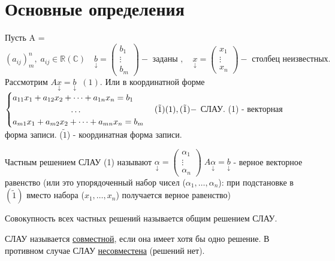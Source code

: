 \documentclass[../main.tex]{subfiles}
\begin{document}
\section{Основные определения}
\noindent Пусть A = $(a_{ij})_{m}^{n},\; a_{ij}\in\mathbb{R}(\mathbb{C})\quad \underset{\downarrow}{b}=\begin{pmatrix} {b}_{1}\\ \vdots\\ {b}_{m} \end{pmatrix}- \text{ заданы },\quad \underset{\downarrow}{x}=\begin{pmatrix} {x}_{1}\\ \vdots\\ {x}_{n} \end{pmatrix} -\text{ столбец неизвестных.}$\\ 
Рассмотрим $A \underset{\downarrow}{x}=\underset{\downarrow}{b}\;\;(1).$ Или в координатной форме $\begin{cases}
    a_{11}x_{1}+a_{12}x_{2}+\dots+a_{1n}x_{n}=b_{1}\\
    \phantom{a_{11}x_{1}+a_{12}x_{2}+} \dots\\
    a_{m1}x_{1}+a_{m2}x_{2}+\dots+a_{mn}x_{n}=b_{m}
\end{cases}(\tilde{1})\\ (1),(\tilde{1}) - $ СЛАУ. (1) - векторная форма записи. ($\tilde{1}$) - координатная форма записи. 
\begin{definition}
    Частным решением СЛАУ (1) называют $\underset{\downarrow}{\alpha}=\begin{pmatrix} {\alpha}_{1}\\ \vdots\\ {\alpha}_{n} \end{pmatrix}\; A  \underset{\downarrow}{\alpha}=\underset{\downarrow}{b}$ - верное векторное равенство (или это упорядоченный набор чисел ($\alpha_{1},\dots,\alpha_{n}$): при подстановке в $(\tilde{1})$ вместо набора ($x_{1},\dots,x_{n}$) получается верное равенство)
\end{definition}
\begin{definition}
    Совокупность всех частных решений называется общим решением СЛАУ.
\end{definition}
\begin{definition}
    СЛАУ называется \underline{совместной}, если она имеет хотя бы одно решение. В противном случае СЛАУ \underline{несовместена} (решений нет).
\end{definition}
\end{document}
